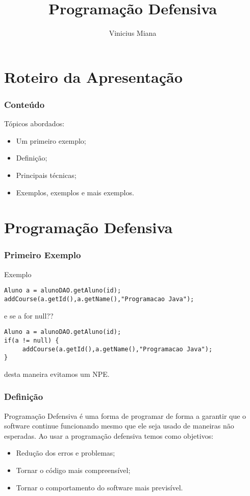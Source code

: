 \documentclass[serif,mathserif]{beamer}
\author[Vinicius Miana]{Vinicius Miana}
\title[Programação Defensiva\hspace{2em}\insertframenumber/\inserttotalframenumber]{Programação Defensiva}
\institute{Universidade Presbiteriana Mackenzie}
\begin{document}
\maketitle

\section{Roteiro da Apresentação}  

\begin{frame}
  \frametitle{Conteúdo}
  Tópicos abordados:
  \begin{itemize}
  \item Um primeiro exemplo;
  \item Definição;
  \item Principais técnicas;
  \item Exemplos, exemplos e mais exemplos.
  \end{itemize}
\end{frame}

\section{Programação Defensiva}  

\begin{frame}[fragile]
  \frametitle{Primeiro Exemplo}
  Exemplo
\begin{lstlisting}
Aluno a = alunoDAO.getAluno(id);
addCourse(a.getId(),a.getName(),"Programacao Java");
\end{lstlisting}
e se a for null??
\begin{lstlisting}
Aluno a = alunoDAO.getAluno(id);
if(a != null) {
     addCourse(a.getId(),a.getName(),"Programacao Java");
}
\end{lstlisting}
desta maneira evitamos um NPE. 
\end{frame}

\begin{frame}[fragile]
  \frametitle{Definição}
  Programação Defensiva é uma forma de programar de forma a garantir que o software
continue funcionando mesmo que ele seja usado de maneiras não esperadas. Ao usar a
programação defensiva temos como objetivos:
  \begin{itemize}
  \item Redução dos erros e problemas;
  \item Tornar o código mais compreensível;
  \item Tornar o comportamento do software mais previsível.
  \end{itemize}

\end{frame}
\end{document}
